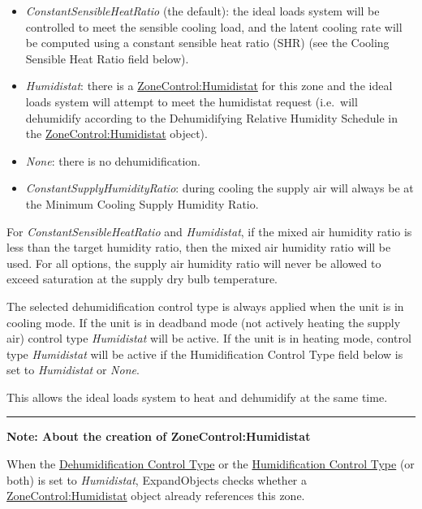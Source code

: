 \begin{itemize}
\item
  \emph{ConstantSensibleHeatRatio} (the default): the ideal loads system will be controlled to meet the sensible cooling load, and the latent cooling rate will be computed using a constant sensible heat ratio (SHR) (see the Cooling Sensible Heat Ratio field below).
\item
  \emph{Humidistat}: there is a \hyperref[zonecontrolhumidistat]{ZoneControl:Humidistat} for this zone and the ideal loads system will attempt to meet the humidistat request (i.e.~will dehumidify according to the Dehumidifying Relative Humidity Schedule in the \hyperref[zonecontrolhumidistat]{ZoneControl:Humidistat} object).
\item
  \emph{None}: there is no dehumidification.
\item
  \emph{ConstantSupplyHumidityRatio}: during cooling the supply air will always be at the Minimum Cooling Supply Humidity Ratio.
\end{itemize}

For \emph{ConstantSensibleHeatRatio} and \emph{Humidistat}, if the mixed air humidity ratio is less than the target humidity ratio, then the mixed air humidity ratio will be used. For all options, the supply air humidity ratio will never be allowed to exceed saturation at the supply dry bulb temperature.

The selected dehumidification control type is always applied when the unit is in cooling mode. If the unit is in deadband mode (not actively heating the supply air) control type \emph{Humidistat} will be active. If the unit is in heating mode, control type \emph{Humidistat} will be active if the Humidification Control Type field below is set to \emph{Humidistat} or \emph{None}.

This allows the ideal loads system to heat and dehumidify at the same time.

\begin{center}\rule{0.5\linewidth}{0.4pt}\end{center}

\textbf{Note: About the creation of ZoneControl:Humidistat}

When the \hyperref[field-dehumidification-control-type-000]{Dehumidification Control Type} or the \hyperref[field-humidification-control-type]{Humidification Control Type} (or both) is set to \emph{Humidistat}, ExpandObjects checks whether a \hyperref[zonecontrolhumidistat]{ZoneControl:Humidistat} object already references this zone.

